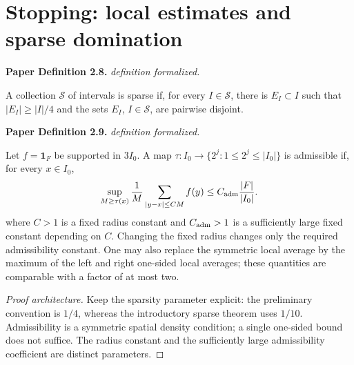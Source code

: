 \section{Stopping: local estimates and sparse domination}

\begin{definition}
\label{SparseData}
\leanok
\par\medskip\noindent\textbf{Paper Definition 2.8.} \textit{definition formalized.}\par
A collection $\mathcal S$ of intervals is sparse if, for every
$I\in\mathcal S$, there is $E_I\subset I$ such that
$|E_I|\geq|I|/4$ and the sets $E_I$, $I\in\mathcal S$, are pairwise
disjoint.
\par\medskip\noindent\textbf{Paper Definition 2.9.} \textit{definition formalized.}\par
Let $f=\mathbf1_F$ be supported in $3I_0$.  A map $\tau:I_0\longrightarrow\{2^j:1\leq2^j\leq|I_0|\}$
is admissible if, for every $x\in I_0$,
\begin{align}
 \sup_{M\geq\tau(x)}\frac1M
 \sum_{|y-x|\leq CM}f(y)
 \leq C_{\rm adm}\frac{|F|}{|I_0|}.
\end{align}
where $C>1$ is a fixed radius constant and $C_{\rm adm}>1$ is a
sufficiently large fixed constant depending on $C$.
Changing the fixed radius changes only the required admissibility
constant. One may also replace the symmetric local average by the
maximum of the left and right one-sided local averages; these
quantities are comparable with a factor of at most two.
\end{definition}
\begin{proof}[Proof architecture]
\leanok
Keep the sparsity parameter explicit: the preliminary convention is $1/4$, whereas the introductory sparse theorem uses $1/10$. Admissibility is a symmetric spatial density condition; a single one-sided bound does not suffice. The radius constant and the sufficiently large admissibility coefficient are distinct parameters.
\end{proof}

